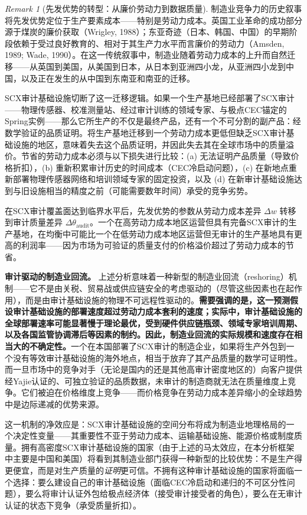 \documentclass[12pt,a4paper]{ctexart}
\theoremstyle{definition}
\theoremstyle{remark}
\newtheorem{remark}{Remark}[section]
\begin{document}
\begin{remark}[先发优势的转型：从廉价劳动力到数据质量]
制造业竞争力的历史叙事将先发优势定位于生产要素成本——特别是劳动力成本。英国工业革命的成功部分源于煤炭的廉价获取（Wrigley, 1988）；东亚奇迹（日本、韩国、中国）的早期阶段依赖于受过良好教育的、相对于其生产力水平而言廉价的劳动力（Amsden, 1989; Wade, 1990）。在这一传统叙事中，制造业随着劳动力成本的上升而自然迁移——从英国到美国，从美国到日本，从日本到亚洲四小龙，从亚洲四小龙到中国，以及正在发生的从中国到东南亚和南亚的迁移。

SCX审计基础设施切断了这一迁移逻辑。如果一个生产基地已经部署了SCX审计——物理传感器、校准测量站、经过审计训练的领域专家、与极点CEC锚定的Spring实例——那么它所生产的不仅是最终产品，还有一个不可分割的副产品：经数学验证的品质证明。将生产基地迁移到一个劳动力成本更低但缺乏SCX审计基础设施的地区，意味着失去这个品质证明，并因此失去其在全球市场中的质量溢价。节省的劳动力成本必须与以下损失进行比较：(a) 无法证明产品质量（导致价格折扣），(b) 重新积累审计历史的时间成本（CEC冷启动问题），(c) 在新地点重新部署物理传感器网络和培训领域专家的固定投资，以及 (d) 在新审计基础设施达到与旧设施相当的精度之前（可能需要数年时间）承受的竞争劣势。

在SCX审计覆盖面达到临界水平后，先发优势的参数从劳动力成本差异 $\Delta w$ 转移到审计质量差异 $\Delta \theta_{\text{audit}}$。一个在高劳动力成本地区运营但具有完备SCX审计的生产基地，在均衡中可能比一个在低劳动力成本地区运营但无审计的生产基地具有更高的利润率——因为市场为可验证的质量支付的价格溢价超过了劳动力成本的节省。
\end{remark}

\textbf{审计驱动的制造业回流。} 上述分析意味着一种新型的制造业回流（reshoring）机制——它不是由关税、贸易战或供应链安全的考虑驱动的（尽管这些因素也在起作用），而是由审计基础设施的物理不可远程性驱动的。\textbf{需要强调的是，这一预测假设审计基础设施的部署速度超过劳动力成本套利的速度；实际中，审计基础设施的全球部署速率可能显著慢于理论最优，受到硬件供应链瓶颈、领域专家培训周期、以及各国监管协调滞后等因素的制约。因此，制造业回流的实际规模和速度存在相当大的不确定性。}一个在本国部署了SCX审计的制造企业，如果将生产外包到一个没有等效审计基础设施的海外地点，相当于放弃了其产品质量的数学可证明性。而一旦市场中的竞争对手（无论是国内的还是其他高审计密度地区的）向客户提供经Yajie认证的、可独立验证的品质数据，未审计的制造商就无法在质量维度上竞争。它们被迫在价格维度上竞争——而价格竞争在劳动力成本差异缩小的全球趋势中是边际递减的优势来源。

这一机制的净效应是：SCX审计基础设施的空间分布将成为制造业地理格局的一个决定性变量——其重要性不亚于劳动力成本、运输基础设施、能源价格或制度质量。拥有高密度SCX审计基础设施的国家（由于上述的马太效应，在本分析框架中主要是中国和美国）将看到其制造业部门获得一种新型的比较优势：不是生产得更便宜，而是对生产质量的\textit{证明}更可信。不拥有这种审计基础设施的国家将面临一个选择：要么建设自己的审计基础设施（面临CEC冷启动和递归的不可区分性问题），要么将审计认证外包给极点经济体（接受审计接受者的角色），要么在无审计认证的状态下竞争（承受质量折扣）。
\end{document}

